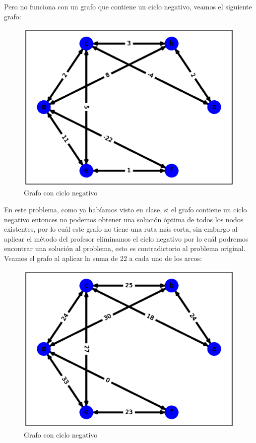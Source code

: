 \documentclass{report}
\begin{document}
\begin{enumerate}
  Pero no funciona con un grafo que contiene un ciclo negativo, veamos el siguiente grafo:
  \begin{figure}[h!t]
    \centering
    \includegraphics[scale = 0.4]{ejemplo11.eps}
    \caption{Grafo con ciclo negativo}
    \label{conciclonegativo}
  \end{figure}
  \newpage
  En este problema, como ya habíamos visto en clase, si el grafo contiene un ciclo negativo entonces no podemos obtener una solución óptima de todos los nodos existentes, por lo cuál este grafo no tiene una ruta más corta, sin embargo al aplicar el método del profesor eliminamos el ciclo negativo por lo cuál podremos encontrar una solución al problema, esto es contradictorio al problema original. Veamos el grafo al aplicar la suma de 22 a cada uno de los arcos:
  \begin{figure}[h!t]
    \centering
    \includegraphics[scale = 0.4]{ejemplo12.eps}
    \caption{Grafo con ciclo negativo}
    \label{conciclonegativo2}
  \end{figure}


\end{enumerate}
\end{document}
